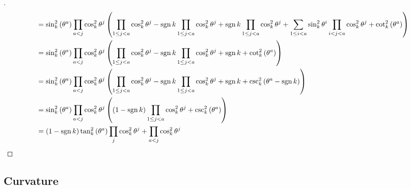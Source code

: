 \documentclass[../main.tex]{subfiles}
\begin{document}
\begin{proof}[]
\begin{align*}
         & =
        \sin_k^2\left(\tensor{\theta}{^a}\right)
        \prod_{a<j}{\cos_k^2\tensor{\theta}{^j}}
        \left(
        \prod_{1\le j<a}{\cos_k^2\tensor{\theta}{^j}}
        -\sign{k}\prod_{1\le j<a}{\cos_k^2\tensor{\theta}{^j}}
        +\sign{k}\prod_{1\le j<a}{\cos_k^2\tensor{\theta}{^j}}
        + \sum_{1\le i<a}{
            \sin_k^2{\tensor{\theta}{^{i}}}\prod_{i<j<a}{\cos_k^2\tensor{\theta}{^j}}
        }
        +\cot_k^2\left(\tensor{\theta}{^a}\right)
        \right)                                                                                                            \\
         & =
        \sin_k^2\left(\tensor{\theta}{^a}\right)
        \prod_{a<j}{\cos_k^2\tensor{\theta}{^j}}
        \left(
        \prod_{1\le j<a}{\cos_k^2\tensor{\theta}{^j}}
        -\sign{k}\prod_{1\le j<a}{\cos_k^2\tensor{\theta}{^j}}
        +\sign{k}
        +\cot_k^2\left(\tensor{\theta}{^a}
        \right)
        \right)                                                                                                            \\
         & =
        \sin_k^2\left(\tensor{\theta}{^a}\right)
        \prod_{a<j}{\cos_k^2\tensor{\theta}{^j}}
        \left(
        \prod_{1\le j<a}{\cos_k^2\tensor{\theta}{^j}}
        -\sign{k}\prod_{1\le j<a}{\cos_k^2\tensor{\theta}{^j}}
        +\sign{k}
        +\csc_k^2\left(\tensor{\theta}{^a}
        -\sign{k}
        \right)
        \right)                                                                                                            \\
         & =
        \sin_k^2\left(\tensor{\theta}{^a}\right)
        \prod_{a<j}{\cos_k^2\tensor{\theta}{^j}}
        \left(
        \left(1-\sign{k}\right)\prod_{1\le j<a}{\cos_k^2\tensor{\theta}{^j}}
        +\csc_k^2\left(\tensor{\theta}{^a}
        \right)
        \right)                                                                                                            \\
         & =
        \left(1-\sign{k}\right)
        \tan_k^2\left(\tensor{\theta}{^a}\right)
        \prod_{j}{\cos_k^2\tensor{\theta}{^j}}
        +
        \prod_{a<j}{\cos_k^2\tensor{\theta}{^j}}
    \end{align*}
\end{proof}
\subsection{Curvature}
\end{document}
